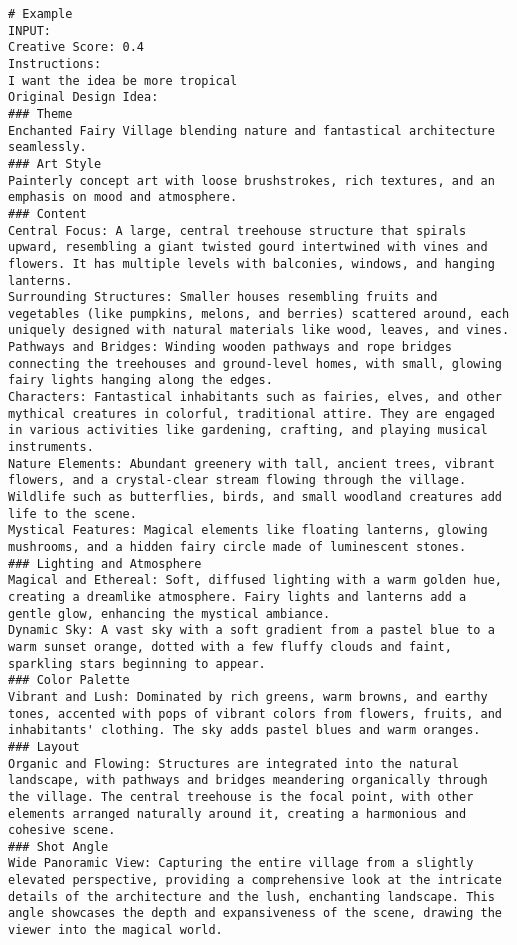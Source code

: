 \begin{lstlisting}
# Example
INPUT:
Creative Score: 0.4
Instructions:
I want the idea be more tropical
Original Design Idea:
### Theme
Enchanted Fairy Village blending nature and fantastical architecture seamlessly.
### Art Style
Painterly concept art with loose brushstrokes, rich textures, and an emphasis on mood and atmosphere.
### Content
Central Focus: A large, central treehouse structure that spirals upward, resembling a giant twisted gourd intertwined with vines and flowers. It has multiple levels with balconies, windows, and hanging lanterns.
Surrounding Structures: Smaller houses resembling fruits and vegetables (like pumpkins, melons, and berries) scattered around, each uniquely designed with natural materials like wood, leaves, and vines.
Pathways and Bridges: Winding wooden pathways and rope bridges connecting the treehouses and ground-level homes, with small, glowing fairy lights hanging along the edges.
Characters: Fantastical inhabitants such as fairies, elves, and other mythical creatures in colorful, traditional attire. They are engaged in various activities like gardening, crafting, and playing musical instruments.
Nature Elements: Abundant greenery with tall, ancient trees, vibrant flowers, and a crystal-clear stream flowing through the village. Wildlife such as butterflies, birds, and small woodland creatures add life to the scene.
Mystical Features: Magical elements like floating lanterns, glowing mushrooms, and a hidden fairy circle made of luminescent stones.
### Lighting and Atmosphere
Magical and Ethereal: Soft, diffused lighting with a warm golden hue, creating a dreamlike atmosphere. Fairy lights and lanterns add a gentle glow, enhancing the mystical ambiance.
Dynamic Sky: A vast sky with a soft gradient from a pastel blue to a warm sunset orange, dotted with a few fluffy clouds and faint, sparkling stars beginning to appear.
### Color Palette
Vibrant and Lush: Dominated by rich greens, warm browns, and earthy tones, accented with pops of vibrant colors from flowers, fruits, and inhabitants' clothing. The sky adds pastel blues and warm oranges.
### Layout
Organic and Flowing: Structures are integrated into the natural landscape, with pathways and bridges meandering organically through the village. The central treehouse is the focal point, with other elements arranged naturally around it, creating a harmonious and cohesive scene.
### Shot Angle
Wide Panoramic View: Capturing the entire village from a slightly elevated perspective, providing a comprehensive look at the intricate details of the architecture and the lush, enchanting landscape. This angle showcases the depth and expansiveness of the scene, drawing the viewer into the magical world.


\end{lstlisting}
